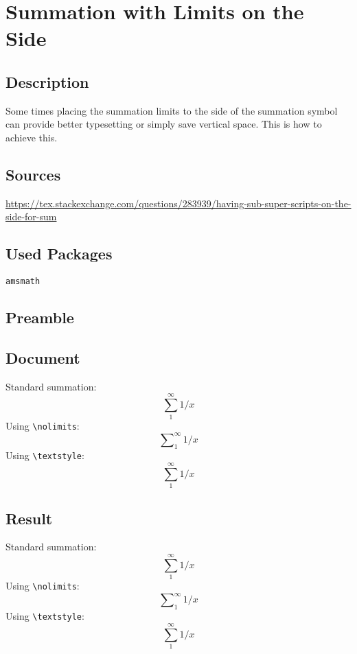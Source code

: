 \documentclass{article}
\begin{document}
\section*{Summation with Limits on the Side}

\subsection*{Description}
Some times placing the summation limits to the side of the summation symbol can provide better typesetting or simply save vertical space. This is how to achieve this.

\subsection*{Sources}
\url{https://tex.stackexchange.com/questions/283939/having-sub-super-scripts-on-the-side-for-sum}

\subsection*{Used Packages}
\verb|amsmath|

\subsection*{Preamble}
\begin{latex}
	\usepackage{amsmath}
\end{latex}

\subsection*{Document}
\begin{latex}
	Standard summation:
	\begin{equation}
	\sum_{1}^{\infty} 1/x
	\end{equation}
	Using \verb|\nolimits|:
	\begin{equation}
	\sum\nolimits_{1}^{\infty}1/x
	\end{equation}
	Using \verb|\textstyle|:
	\begin{equation}
	{\textstyle\sum}_{1}^{\infty}1/x
	\end{equation}
\end{latex}

\subsection*{Result}

Standard summation:
\begin{equation}
\sum_{1}^{\infty} 1/x
\end{equation}
Using \verb|\nolimits|:
\begin{equation}
\sum\nolimits_{1}^{\infty}1/x
\end{equation}
Using \verb|\textstyle|:
\begin{equation}
{\textstyle\sum}_{1}^{\infty}1/x
\end{equation}
\end{document}
